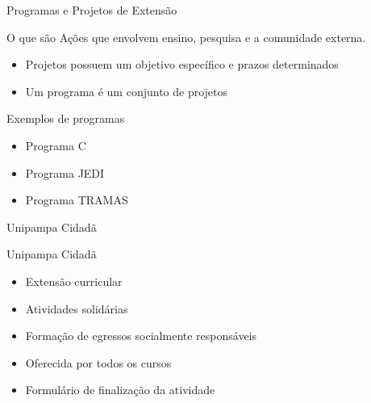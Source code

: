 \begin{frame}{{\sffamily Programas e Projetos de Extensão}}
  \begin{block}{O que são}
    Ações que envolvem ensino, pesquisa e a comunidade externa.
    \begin{itemize}
      \item Projetos possuem um objetivo específico e prazos determinados %
      \item Um programa é um conjunto de projetos
    \end{itemize}
  \end{block}

  \begin{block}{Exemplos de programas}
    \begin{itemize}
      \item Programa C %
      \item Programa JEDI %
      \item Programa TRAMAS %
    \end{itemize}
  \end{block}

\end{frame}

\begin{frame}{{\sffamily Unipampa Cidadã}}
  \begin{block}{Unipampa Cidadã}
    \begin{itemize}
      \item Extensão curricular
      \item Atividades solidárias %
      \item Formação de egressos socialmente responsáveis %
      \item Oferecida por todos os cursos
      \item Formulário de finalização da atividade
    \end{itemize}
  \end{block}
\end{frame}